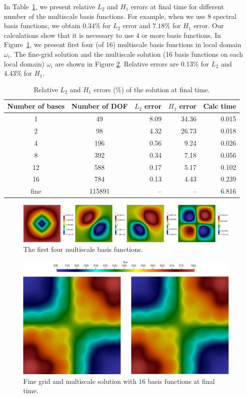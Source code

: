 \documentclass[authoryear]{elsarticle}
\begin{document}
In Table~\ref{t2}, we present relative $L_2$ and $H_1$ errors at final time for different number of the multiscale basis functions.
For example, when we use 8 spectral basis functions, we obtain $0.34\%$ for $L_2$ error and $7.18\%$ for $H_1$ error.
Our calculations show that it is necessary to use 4 or more basis functions.
In Figure~\ref{p7}, we present first four (of 16) multiscale basis functions in local domain $\omega_i$.
The fine-grid solution and the multiscale solution (16 basis functions on each local domain) $\omega_i$ are shown in Figure \ref{p6}. Relative errors are 0.13\% for $L_2$ and 4.43\% for $H_1$.

\begin{table}[ht]
	\caption{Relative $L_2$ and $H_1$ errors ($\%$) of the solution at final time.}
	\label{t2}
	\begin{center}
		\begin{tabular}{ c c r r r }
			\hline
			Number of bases & Number of DOF & $L_2$ error & $H_1$ error & Calc time\\
			\hline
			1 & 49 & 8.09 & 34.36 & 0.015 \\
			2 & 98 & 4.32 & 26.73 & 0.018 \\
			4 & 196 & 0.56 & 9.24 & 0.026 \\
			8 & 392 & 0.34 & 7.18 & 0.056 \\
			12 & 588 & 0.17 & 5.17 & 0.102 \\
			16 & 784 & 0.13 & 4.43 & 0.239 \\
			fine & 115891 & -- & -- & 6.816 \\
			\hline
		\end{tabular}
	\end{center}
\end{table}

\begin{figure}[h!]
	\centering
		\includegraphics[width=0.95\linewidth]{basis.png}
	\caption{The first four multiscale basis functions.}
	\label{p7}
\end{figure}

\begin{figure}[h!]
	\centering
		\includegraphics[width=0.75\linewidth]{flux.png}
	\caption{Fine grid and multiscale solution with 16 basis functions at final time.}
	\label{p6}
\end{figure}
\end{document}

